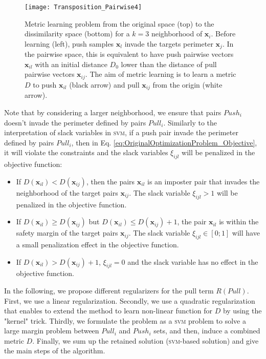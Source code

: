 \begin{figure}[t!]
	\centering
	\texttt{[image: Transposition\_Pairwise4]}
	\caption{Metric learning problem from the original space (top) to the dissimilarity space (bottom) for a $k=3$ neighborhood of $\textbf{x}_i$. Before learning (left), push samples $\textbf{x}_l$ invade the targets perimeter $\textbf{x}_j$. In the pairwise space, this is equivalent to have push pairwise vectors $\textbf{x}_{il}$ with an initial distance $D_0$ lower than the distance of pull pairwise vectors $\textbf{x}_{ij}$. The aim of metric learning is to learn a metric $D$ to push $\textbf{x}_{il}$ (black arrow) and pull $\textbf{x}_{ij}$ from the origin (white arrow).}
	\label{fig:Transposition_Pairwise}
\end{figure}
\noindent Note that by considering a larger neighborhood, we ensure that pairs $Push_i$ doesn't invade the perimeter defined by pairs $Pull_i$. Similarly to the interpretation of slack variables in \textsc{svm}, if a push pair invade the perimeter defined by pairs $Pull_i$, then in Eq. \ref{eq:OriginalOptimizationProblem_Objective}, it will violate the constraints and the slack variables $\xi_{ijl}$ will be penalized in the objective function:
\begin{itemize}
	\item If $D(\textbf{x}_{il}) < D(\textbf{x}_{ij})$, then the pairs $\textbf{x}_{il}$ is an imposter pair that invades the neighborhood of the target pairs $\textbf{x}_{ij}$. The slack variable  $\xi_{ijl} > 1$ will be penalized in the objective function. 
	\item If $D(\textbf{x}_{il}) \geq D(\textbf{x}_{ij})$ but $D(\textbf{x}_{il}) \leq D(\textbf{x}_{ij})+1$, the pair $\textbf{x}_{il}$ is within the safety margin of the target pairs $\textbf{x}_{ij}$. The slack variable $ \xi_{ijl} \in [0;1]$ will have a small penalization effect in the objective function.
	\item If $D(\textbf{x}_{il}) > D(\textbf{x}_{ij}) +1$, $\xi_{ijl} = 0$ and the slack variable has no effect in the objective function.
\end{itemize}




In the following, we propose different regularizers for the pull term $R(Pull)$. First, we use a linear regularization. Secondly, we use a quadratic regularization that enables to extend the method to learn non-linear function for $D$ by using the "kernel" trick. Thirdly, we formulate the problem as a \textsc{svm} problem to solve a large margin problem between $Pull_i$ and $Push_i$ sets, and then, induce a combined metric $D$. Finally, we sum up the retained solution (\textsc{svm}-based solution) and give the main steps of the algorithm.


